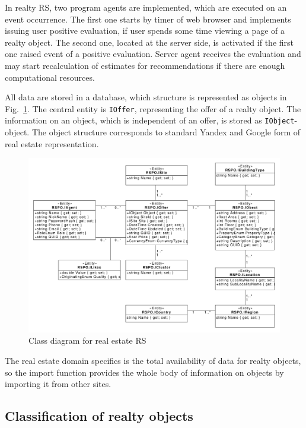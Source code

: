 \documentclass[conference,a4]{IEEEtran}
\begin{document}
In realty RS, two program agents are implemented, which are executed on an event occurrence.  The first one starts by timer of web browser and implements issuing user positive evaluation, if user spends some time viewing a page of a realty object.  The second one, located at the server side, is activated if the first one raised event of a positive evaluation.  Server agent receives the evaluation and may start recalculation of estimates for recommendations if there are enough computational resources.

All data are stored in a database, which structure is represented as objects in Fig.~\ref{fig:class-siag}.  The central entity is \texttt{IOffer}, representing the offer of a realty object.  The information on an object, which is independent of an offer, is stored as \texttt{IObject}-object.  The object structure corresponds to standard Yandex and Google form of real estate representation.

\begin{figure}[tb]
  \centering
   \includegraphics[width=0.7\linewidth]{class_diagram.pdf}
  \caption{Class diagram for real estate RS}
  \label{fig:class-siag}
\end{figure}

The real estate domain specifics is the total availability of data for realty objects, so the import function provides the whole body of information on objects by importing it from other sites.


\subsection{Classification of realty objects}
\label{sec:class-realty}

\end{document}
